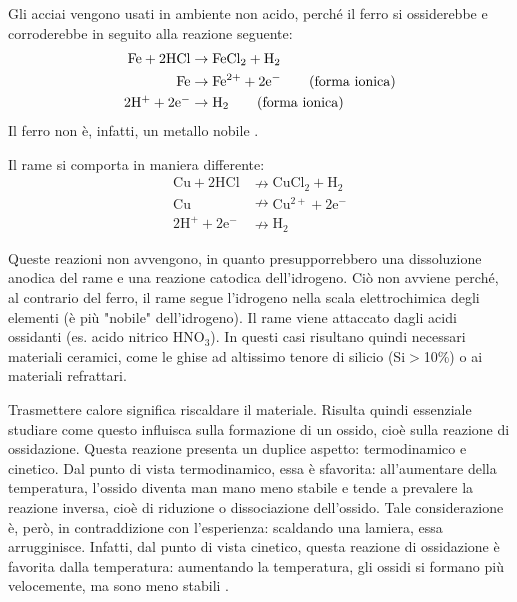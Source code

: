 Gli acciai vengono usati in ambiente non acido, perché il ferro si ossiderebbe e corroderebbe in seguito alla reazione seguente:
\begin{align*}
\mathrm{Fe} + \mathrm{2HCl} &\to \mathrm{FeCl_2 + H_2} \\
\mathrm{Fe} &\to \mathrm{Fe^{2+} + 2e^-} \tag{forma ionica}\\
\mbox{$\mathrm{2H^+ + 2e^-}$} &\to \mbox{$\mathrm{H_2}$} \tag{forma ionica}
\end{align*}
Il ferro non è, infatti, un metallo nobile .

Il rame si comporta in maniera differente:
\begin{align*}
    \mathrm{Cu +2HCl} &\nrightarrow \mathrm{CuCl_2 + H_2}\\
    \mathrm{Cu} &\nrightarrow \mathrm{Cu^{2+} + 2e^-} \tag{forma ionica}\\
    \mathrm{2H^+ + 2e^-} &\nrightarrow \mathrm{H_2} \tag{forma ionica}
\end{align*}

Queste reazioni non avvengono, in quanto presupporrebbero una dissoluzione anodica del rame e una reazione catodica dell'idrogeno. Ciò non avviene perché, al contrario del ferro, il rame segue l'idrogeno nella scala elettrochimica degli elementi (è più "nobile" dell'idrogeno).
Il rame viene attaccato dagli acidi ossidanti (es. acido nitrico $\mathrm{HNO_3}$).
In questi casi risultano quindi necessari materiali ceramici, come le ghise ad altissimo tenore di silicio (Si$>$10\%) o ai materiali refrattari.

Trasmettere calore significa riscaldare il materiale. Risulta quindi essenziale studiare come questo influisca sulla  formazione di un ossido, cioè sulla reazione di ossidazione. Questa reazione presenta un duplice aspetto: termodinamico e cinetico.
Dal punto di vista termodinamico, essa è sfavorita: all’aumentare della temperatura, l’ossido diventa man mano meno stabile e tende a prevalere la reazione inversa, cioè di riduzione o dissociazione dell’ossido.
Tale considerazione è, però, in contraddizione con l’esperienza: scaldando una lamiera, essa arrugginisce. Infatti, dal punto di vista cinetico, questa reazione di ossidazione è favorita dalla temperatura: aumentando la temperatura, gli ossidi si formano più velocemente, ma sono meno stabili .

